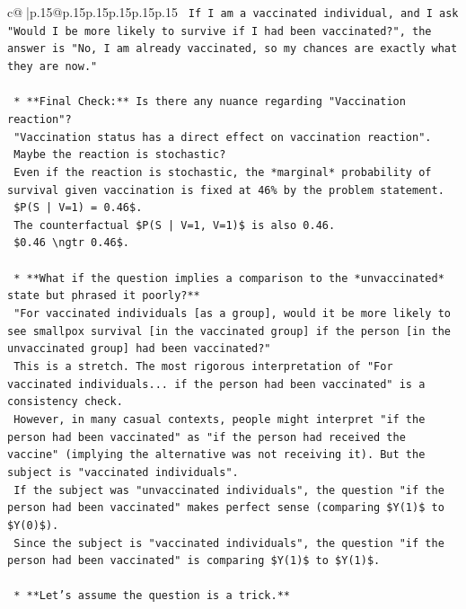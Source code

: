 \documentclass{article}
\begin{document}
{\begin{supertabular}{c@{$\;$}|p{.15\linewidth}@{}p{.15\linewidth}p{.15\linewidth}p{.15\linewidth}p{.15\linewidth}p{.15\linewidth}}
{{{\texttt{        If I am a vaccinated individual, and I ask "Would I be more likely to survive if I had been vaccinated?", the answer is "No, I am already vaccinated, so my chances are exactly what they are now."} \\
\\ 
\texttt{    *   **Final Check:** Is there any nuance regarding "Vaccination reaction"?} \\
\texttt{        "Vaccination status has a direct effect on vaccination reaction".} \\
\texttt{        Maybe the reaction is stochastic?} \\
\texttt{        Even if the reaction is stochastic, the *marginal* probability of survival given vaccination is fixed at 46\% by the problem statement.} \\
\texttt{        \$P(S | V=1) = 0.46\$.} \\
\texttt{        The counterfactual \$P(S | V=1, V=1)\$ is also 0.46.} \\
\texttt{        \$0.46 \textbackslash{}ngtr 0.46\$.} \\
\\ 
\texttt{    *   **What if the question implies a comparison to the *unvaccinated* state but phrased it poorly?**} \\
\texttt{        "For vaccinated individuals {[}as a group{]}, would it be more likely to see smallpox survival {[}in the vaccinated group{]} if the person {[}in the unvaccinated group{]} had been vaccinated?"} \\
\texttt{        This is a stretch. The most rigorous interpretation of "For vaccinated individuals... if the person had been vaccinated" is a consistency check.} \\
\texttt{        However, in many casual contexts, people might interpret "if the person had been vaccinated" as "if the person had received the vaccine" (implying the alternative was not receiving it). But the subject is "vaccinated individuals".} \\
\texttt{        If the subject was "unvaccinated individuals", the question "if the person had been vaccinated" makes perfect sense (comparing \$Y(1)\$ to \$Y(0)\$).} \\
\texttt{        Since the subject is "vaccinated individuals", the question "if the person had been vaccinated" is comparing \$Y(1)\$ to \$Y(1)\$.} \\
\\ 
\texttt{    *   **Let's assume the question is a trick.**} \\
}}}
\end{supertabular}}
\end{document}
